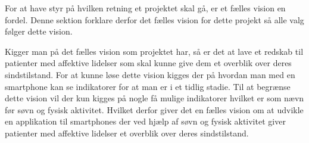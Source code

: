 For at have styr på hvilken retning et projektet skal gå, er et fælles vision en fordel.
Denne sektion forklare derfor det fælles vision for dette projekt så alle valg følger dette vision.

Kigger man på det fælles vision som projektet har, så er det at lave et redskab til patienter med affektive lidelser som skal kunne give dem et overblik over deres sindstilstand.
For at kunne løse dette vision kigges der på hvordan man med en smartphone kan se indikatorer for at man er i et tidlig stadie.
Til at begrænse dette vision vil der kun kigges på nogle få mulige indikatorer hvilket er som nævn før søvn og fysisk aktivitet.
Hvilket derfor giver det en fælles vision om at udvikle en applikation til smartphones der ved hjælp af søvn og fysisk aktivitet giver patienter med affektive lidelser et overblik over deres sindstilstand.